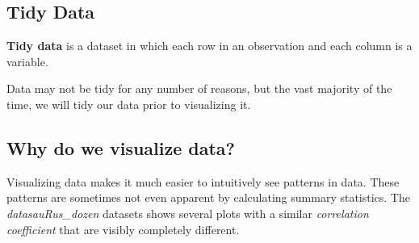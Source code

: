 \documentclass[titlepage, 12pt, leqno]{article}
\begin{document}
\subsection{Tidy Data}
\begin{definition}
    \textbf{Tidy data} is a dataset in which each row in an observation and each column is a variable.
\end{definition}
Data may not be tidy for any number of reasons, but the vast majority of the time, we will tidy our data prior to visualizing it.

\subsection{Why do we visualize data?}
Visualizing data makes it much easier to intuitively see patterns in data. These patterns are sometimes not even apparent by calculating summary statistics. The \textit{datasauRus\_dozen} datasets shows several plots with a similar \textit{correlation coefficient} that are visibly completely different.
\end{document}
